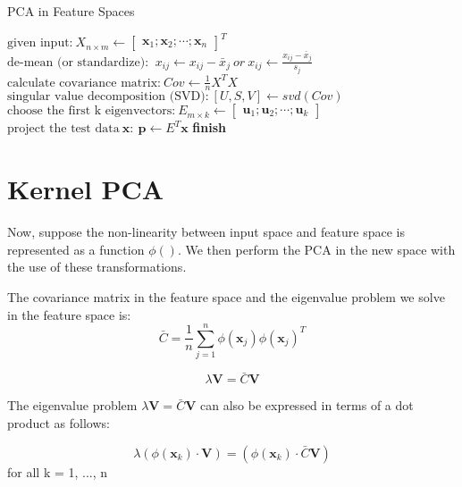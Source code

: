 \begin{algorithm}[H]
\caption{PCA in Feature Spaces}
\label{PCA}
\begin{algorithmic}[1]
	\State $\text{given input:} \  X_{n \times m} \leftarrow \begin{bmatrix} \mathbf{x}_1; \mathbf{x}_2; \cdots; \mathbf{x}_n \end{bmatrix}^T$
	\State $\text{de-mean (or standardize): } \  x_{ij} \leftarrow x_{ij} - \bar{x}_j \  or \  x_{ij} \leftarrow \frac{x_{ij} - \bar{x}_j}{s_j}$
	\State $\text{calculate covariance matrix:} \  Cov \leftarrow \frac{1}{n} X^T X$
	\State $\text{singular value decomposition (SVD):} \  [U, S, V] \leftarrow svd(Cov)$
	\State $\text{choose the first k eigenvectors:} \  E_{m \times k} \leftarrow \begin{bmatrix} \mathbf{u}_1; \mathbf{u}_2; \cdots; \mathbf{u}_k \end{bmatrix}$
	\State $\text{project the test data} \  \mathbf{x}: \  \mathbf{p} \leftarrow E^T \mathbf{x}$
\BState \bf finish
\EndProcedure
\end{algorithmic}
\end{algorithm}


\section{Kernel PCA}

Now, suppose the non-linearity between input space and feature space is represented as a function $\phi()$. We then perform the PCA in the new space with the use of these transformations.

The covariance matrix in the feature space and the eigenvalue problem we solve in the feature space is:
\begin{equation}
\bar{C} = \frac{1}{n} \sum_{j=1}^n \phi(\pmb{x}_j) \phi(\pmb{x}_j)^T
\end{equation}

\begin{equation}
\lambda \pmb{V} = \bar{C} \pmb{V}
\end{equation}

The eigenvalue problem $\lambda \pmb{V} = \bar{C} \pmb{V}$ can also be expressed in terms of a dot product as follows: 

\begin{equation}
\lambda(\phi(\pmb{x}_k) \cdot \pmb{V}) = (\phi(\pmb{x}_k) \cdot\bar{C} \pmb{V})
\end{equation}
for all k = 1, ..., n

